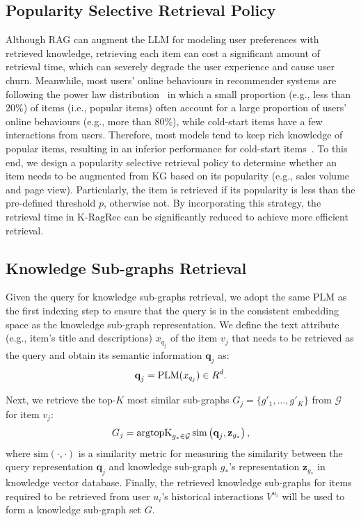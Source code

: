  \subsection{Popularity Selective Retrieval Policy}
Although RAG can augment the LLM for modeling user preferences with retrieved knowledge, retrieving each item can cost a significant amount of retrieval time, which can severely degrade the user experience and cause user churn.
Meanwhile, most users’ online behaviours in recommender systems are following the power law distribution~\citep{abdollahpouri2017controlling,celma2008new} in which a small proportion (e.g., less than 20\%) of items (i.e., popular items) often account for a large proportion of users’ online behaviours (e.g., more than 80\%), while cold-start items have a few interactions from users.
Therefore, most models tend to keep rich knowledge of popular items, resulting in an inferior performance for cold-start items~\citep{zhao2023popularity}. 
To this end, we design a popularity selective retrieval policy to determine whether an item needs to be augmented from KG based on its popularity (e.g., sales volume and page view). 
Particularly, the item is retrieved if its popularity is less than the pre-defined threshold $p$, otherwise not. 
By incorporating this strategy, the retrieval time in K-RagRec can be significantly reduced to achieve more efficient retrieval. 


 \subsection{Knowledge Sub-graphs Retrieval} 
Given the query for knowledge sub-graphs retrieval, we adopt the same PLM as the first indexing step to ensure that the query is in the consistent embedding space as the knowledge sub-graph representation. 
We define the text attribute (e.g., item's title and descriptions) $x_{q_j}$ of the item $v_j$ that needs to be retrieved as the query and obtain its semantic information $\textbf{q}_j$ as: 
\begin{equation}
\setlength{\abovedisplayskip}{2pt}
\setlength{\belowdisplayskip}{2pt}
\textbf{q}_j=\text{PLM}(x_{q_j})\in {R}^d.
\end{equation}


Next, we retrieve the top-$K$ most similar sub-graphs $G_j=\{g'_1, ..., g'_K\}$ from  $\mathcal{G}$ for item $v_j$:  
\begin{equation}
\setlength{\abovedisplayskip}{3pt}
\setlength{\belowdisplayskip}{3pt}
G_{j} = \operatorname{argtopK}_{g_* \in \mathcal{G}} \text{sim} \left(\textbf{q}_j, \textbf{z}_{g_*} \right),
\end{equation}
where  ${\text{sim}(\cdot, \cdot)}$ is a similarity metric for measuring the similarity between the query representation $\textbf{q}_j$ and knowledge sub-graph ${g_*}$'s representation $\textbf{z}_{g_*}$  in knowledge vector database. 
Finally,  the retrieved knowledge sub-graphs for items required to be retrieved from user ${u_i}$'s historical interactions $V^{u_i}$ will be used to form a knowledge sub-graph set $G$.


